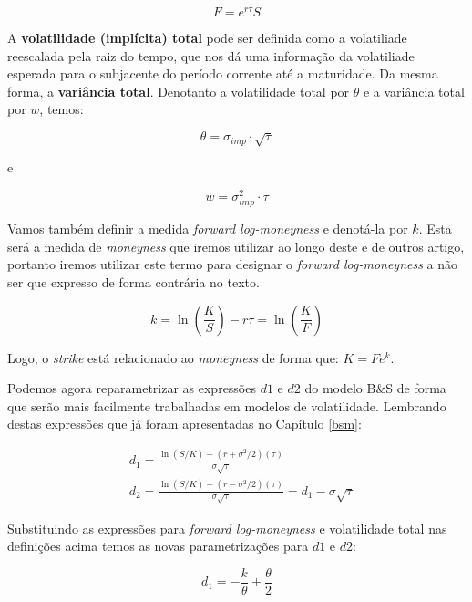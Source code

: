 \documentclass[]{book}
\begin{document}
\begin{equation}
F=e^{r\tau}S
\end{equation}

A \textbf{volatilidade (implícita) total} pode ser definida como a
volatiliade reescalada pela raiz do tempo, que nos dá uma informação da
volatiliade esperada para o subjacente do período corrente até a
maturidade. Da mesma forma, a \textbf{variância total}. Denotanto a
volatilidade total por \(\theta\) e a variância total por \(w\), temos:

\begin{equation}
\theta=\sigma_{imp}\cdot \sqrt{\tau} 
\label{eq:voltotal}
\end{equation}

e

\begin{equation}
w=\sigma_{imp}^2\cdot\tau
\label{eq:vartotal}
\end{equation}

Vamos também definir a medida \emph{forward log-moneyness} e denotá-la
por \(k\). Esta será a medida de \emph{moneyness} que iremos utilizar ao
longo deste e de outros artigo, portanto iremos utilizar este termo para
designar o \emph{forward log-moneyness} a não ser que expresso de forma
contrária no texto.

\begin{equation}
k=\ln\left(\frac{K}{S}\right)-r\tau=\ln\left(\frac{K}{F}\right)
\label{eq:flmoneyness}
\end{equation}

Logo, o \emph{strike} está relacionado ao \emph{moneyness} de forma que:
\(K=Fe^k\).

Podemos agora reparametrizar as expressões \(d1\) e \(d2\) do modelo
B\&S de forma que serão mais facilmente trabalhadas em modelos de
volatilidade. Lembrando destas expressões que já foram apresentadas no
Capítulo \ref{bsm}:

\begin{align}
&d_{1}={\frac {\ln(S/K)+(r+\sigma ^{2}/2)(\tau)}{\sigma {\sqrt {\tau}}}}\\
&d_{2}={\frac {\ln(S/K)+(r-\sigma ^{2}/2)(\tau)}{\sigma {\sqrt {\tau}}}}=d_1-\sigma\sqrt{\tau}
\end{align}

Substituindo as expressões para \emph{forward log-moneyness} e
volatilidade total nas definições acima temos as novas parametrizações
para \(d1\) e \(d2\):

\begin{equation}
d_{1}={-\frac{k}{\theta}+\frac{\theta}{2}}
\label{eq:d1mod}
\end{equation}
\end{document}
